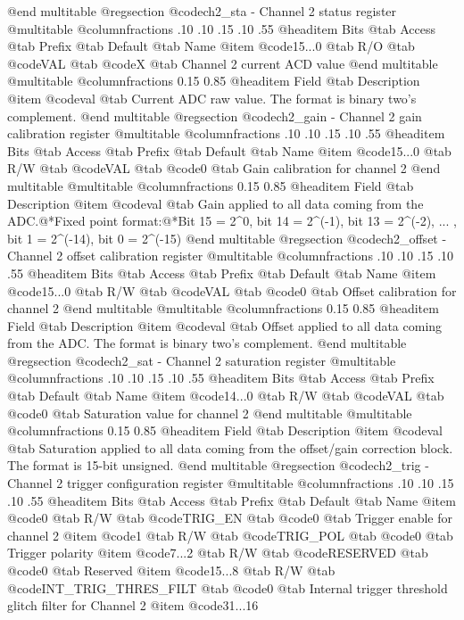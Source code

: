 @end multitable
@regsection @code{ch2_sta} - Channel 2 status register
@multitable @columnfractions .10 .10 .15 .10 .55
@headitem Bits @tab Access @tab Prefix @tab Default @tab Name
@item @code{15...0}
@tab R/O @tab
@code{VAL}
@tab @code{X} @tab 
Channel 2 current ACD value
@end multitable
@multitable @columnfractions 0.15 0.85
@headitem Field @tab Description
@item @code{val} @tab Current ADC raw value. The format is binary two's complement.
@end multitable
@regsection @code{ch2_gain} - Channel 2 gain calibration register
@multitable @columnfractions .10 .10 .15 .10 .55
@headitem Bits @tab Access @tab Prefix @tab Default @tab Name
@item @code{15...0}
@tab R/W @tab
@code{VAL}
@tab @code{0} @tab 
Gain calibration for channel 2
@end multitable
@multitable @columnfractions 0.15 0.85
@headitem Field @tab Description
@item @code{val} @tab Gain applied to all data coming from the ADC.@*Fixed point format:@*Bit 15 = 2^0, bit 14 = 2^(-1), bit 13 = 2^(-2), ... , bit 1 = 2^(-14), bit 0 = 2^(-15)
@end multitable
@regsection @code{ch2_offset} - Channel 2 offset calibration register
@multitable @columnfractions .10 .10 .15 .10 .55
@headitem Bits @tab Access @tab Prefix @tab Default @tab Name
@item @code{15...0}
@tab R/W @tab
@code{VAL}
@tab @code{0} @tab 
Offset calibration for channel 2
@end multitable
@multitable @columnfractions 0.15 0.85
@headitem Field @tab Description
@item @code{val} @tab Offset applied to all data coming from the ADC. The format is binary two's complement.
@end multitable
@regsection @code{ch2_sat} - Channel 2 saturation register
@multitable @columnfractions .10 .10 .15 .10 .55
@headitem Bits @tab Access @tab Prefix @tab Default @tab Name
@item @code{14...0}
@tab R/W @tab
@code{VAL}
@tab @code{0} @tab 
Saturation value for channel 2
@end multitable
@multitable @columnfractions 0.15 0.85
@headitem Field @tab Description
@item @code{val} @tab Saturation applied to all data coming from the offset/gain correction block. The format is 15-bit unsigned.
@end multitable
@regsection @code{ch2_trig} - Channel 2 trigger configuration register
@multitable @columnfractions .10 .10 .15 .10 .55
@headitem Bits @tab Access @tab Prefix @tab Default @tab Name
@item @code{0}
@tab R/W @tab
@code{TRIG_EN}
@tab @code{0} @tab 
Trigger enable for channel 2
@item @code{1}
@tab R/W @tab
@code{TRIG_POL}
@tab @code{0} @tab 
Trigger polarity
@item @code{7...2}
@tab R/W @tab
@code{RESERVED}
@tab @code{0} @tab 
Reserved
@item @code{15...8}
@tab R/W @tab
@code{INT_TRIG_THRES_FILT}
@tab @code{0} @tab 
Internal trigger threshold glitch filter for Channel 2
@item @code{31...16}
